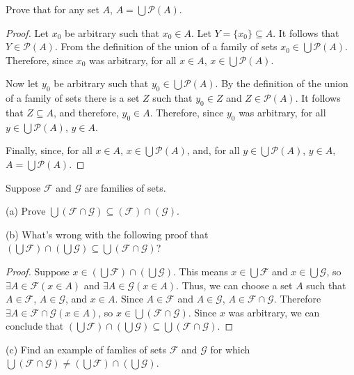 \begin{tcolorbox}[title=Problem 17, breakable]
    Prove that for any set $A$, $A = \bigcup \mathcal{P}(A)$.
\end{tcolorbox}

\begin{proof}
    Let $x_0$ be arbitrary such that $x_0 \in A$.
    Let $Y = \{x_0\} \subseteq A$.
    It follows that $Y \in \mathcal{P}(A)$.
    From the definition of the union of a family of sets $x_0 \in \bigcup \mathcal{P}(A)$.
    Therefore, since $x_0$ was arbitrary, for all $x \in A$, $x \in \bigcup \mathcal{P}(A)$.

    Now let $y_0$ be arbitrary such that $y_0 \in \bigcup \mathcal{P}(A)$. By the
    definition of the union of a family of sets there is a set $Z$ such that $y_0
        \in Z$ and $Z \in \mathcal{P}(A)$. It follows that $Z \subseteq A$, and
    therefore, $y_0 \in A$. Therefore, since $y_0$ was arbitrary, for all $y \in
        \bigcup \mathcal{P}(A)$, $y \in A$.

    Finally, since, for all $x \in A$, $x \in \bigcup \mathcal{P}(A)$, and, for all
    $y \in \bigcup \mathcal{P}(A)$, $y \in A$, $A = \bigcup \mathcal{P}(A)$.
\end{proof}

\begin{tcolorbox}[title=Problem 18, breakable]
    Suppose $\mathcal{F}$ and $\mathcal{G}$ are families of sets.

    (a) Prove $\bigcup (\mathcal{F} \cap \mathcal{G}) \subseteq (\mathcal{F}) \cap (\mathcal{G})$.

    (b) What's wrong with the following proof that 
    $(\bigcup \mathcal{F}) \cap (\bigcup \mathcal{G}) \subseteq \bigcup(\mathcal{F} \cap \mathcal{G})$?
    \begin{proof}
        Suppose $x \in (\bigcup \mathcal{F}) \cap (\bigcup \mathcal{G})$. This means $x \in \bigcup \mathcal{F}$
        and $x \in \bigcup \mathcal{G}$, so $\exists A \in \mathcal{F}(x \in A)$ and $\exists A \in \mathcal{G}(x \in A)$.
        Thus, we can choose a set $A$ such that $A \in \mathcal{F}$, $A \in \mathcal{G}$, and $x \in A$. Since 
        $A \in \mathcal{F}$ and $A \in \mathcal{G}$, $A \in \mathcal{F} \cap \mathcal{G}$. 
        Therefore $\exists{A} \in \mathcal{F} \cap \mathcal{G}(x \in A)$,
        so $x \in \bigcup(\mathcal{F} \cap \mathcal{G})$. Since $x$ was arbitrary, we can conclude that 
        $(\bigcup \mathcal{F}) \cap (\bigcup \mathcal{G}) \subseteq \bigcup(\mathcal{F} \cap \mathcal{G})$.
    \end{proof}

    (c) Find an example of famlies of sets $\mathcal{F}$ and $\mathcal{G}$ for which 
    $\bigcup(\mathcal{F} \cap \mathcal{G}) \not = (\bigcup \mathcal{F}) \cap (\bigcup \mathcal{G})$.
\end{tcolorbox}

